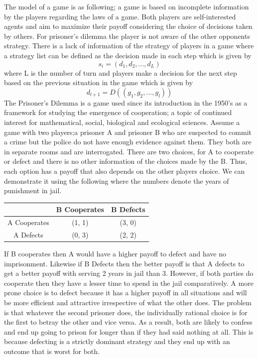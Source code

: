\documentclass[runningheads]{llncs}
\begin{document}
The model of a game is as following; a game is based on incomplete information by the players regarding the laws of a game. Both players are self-interested agents and aim to maximize their payoff considering the choice of decisions taken by others. For prisoner's dilemma the player is not aware of the other opponents strategy. There is a lack of information of the strategy of players in a game where a strategy list can be defined as the decision made in each step which is given by 
\begin{equation}
    s_i = (d_1, d_2,..., d_L)
\end{equation}  
where L is the number of turn and players make a decision for the next step based on the previous situation in the game which is given by 
\begin{equation}
    d_{l +1} = D ({(g_1 , g_2, ..., g_l)}) 
\end{equation}
The Prisoner’s Dilemma is a game used since its introduction in the 1950’s as a framework for studying the emergence of cooperation; a topic of continued interest for mathematical, social, biological and ecological sciences. \cite{ref_lncs1}  Assume a game with two players;a prisoner A and prisoner B who are suspected to commit a crime but the police do not have enough evidence against them. They both are in separate rooms and are interrogated.  There are two choices, for A to cooperate or defect and there is no other information of the choices made by the B. Thus, each option has a payoff that also depends on the other players choice.  We can demonstrate it using the following where the numbers denote the years of punishment in jail. 

\begin{center}
\begin{tabular}{ | c | c| c | } 
\hline
 & B Cooperates & B Defects \\ 
\hline
A Cooperates  & (1, 1)  & (3, 0) \\ 
\hline
A Defects  & (0, 3)  & (2, 2) \\ 
\hline
\end{tabular}
\end{center}

If B cooperates then A would have a higher payoff to defect and have no imprisonment.  Likewise if B Defects then the better payoff is that A defects to get a better payoff with serving 2 years in jail than 3.   However, if both parties do cooperate then they have a lesser time to spend in the jail comparatively. A more prone choice is to defect because it has a higher payoff in all situations and will be more efficient and attractive irrespective of what the other does.
The problem is that whatever the second prisoner does, the individually rational choice is for the first to betray the other and vice versa. As a result, both are likely to confess and end up going to prison for longer than if they had said nothing at all. This is because defecting is a strictly dominant strategy and they end up with an outcome that is worst for both.
\end{document}
